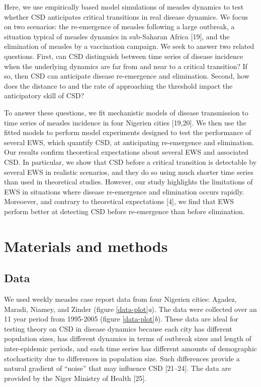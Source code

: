 \documentclass[3p]{elsarticle} %
\begin{document}
Here, we use empirically based model simulations of measles dynamics to
test whether CSD anticipates critical transitions in real disease
dynamics. We focus on two scenarios: the re-emergence of measles
following a large outbreak, a situation typical of measles dynamics in
sub-Saharan Africa {[}19{]}, and the elimination of measles by a
vaccination campaign. We seek to answer two related questions. First,
can CSD distinguish between time series of disease incidence when the
underlying dynamics are far from and near to a critical transition? If
so, then CSD can anticipate disease re-emergence and elimination.
Second, how does the distance to and the rate of approaching the
threshold impact the anticipatory skill of CSD?

To answer these questions, we fit mechanistic models of disease
transmission to time series of measles incidence in four Nigerien cities
{[}19,20{]}. We then use the fitted models to perform model experiments
designed to test the performance of several EWS, which quantify CSD, at
anticipating re-emergence and elimination. Our results confirm
theoretical expectations about several EWS and associated CSD. In
particular, we show that CSD before a critical transition is detectable
by several EWS in realistic scenarios, and they do so using much shorter
time series than used in theoretical studies. However, our study
highlights the limitations of EWS in situations where disease
re-emergence and elimination occurs rapidly. Moreoever, and contrary to
theoretical expectations {[}4{]}, we find that EWS perform better at
detecting CSD before re-emergence than before elimination.

\hypertarget{materials-and-methods}{%
\section{Materials and methods}\label{materials-and-methods}}

\hypertarget{data}{%
\subsection{Data}\label{data}}

We used weekly measles case report data from four Nigerien cities:
Agadez, Maradi, Niamey, and Zinder (figure \ref{data-plot}\emph{a}). The
data were collected over an 11 year period from 1995-2005 (figure
\ref{data-plot}\emph{b}). These data are ideal for testing theory on CSD
in disease dynamics because each city has different population sizes,
has different dynamics in terms of outbreak sizes and length of
inter-epidemic periods, and each time series has different amounts of
demographic stochasticity due to differences in population size. Such
differences provide a natural gradient of ``noise'' that may influence
CSD {[}21--24{]}. The data are provided by the Niger Ministry of Health
{[}25{]}.
\end{document}
